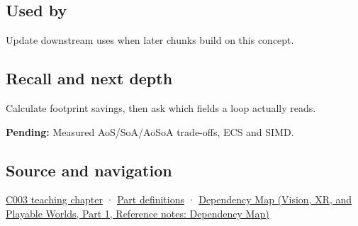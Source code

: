 \subsection{Used by}\label{appendix-5522ad176ca0-used-by}

\hypertarget{appendix-5522ad176ca0-used-by}{}

Update downstream uses when later chunks build on this concept.

\subsection{Recall and next depth}\label{appendix-5522ad176ca0-recall-and-next-depth}

\hypertarget{appendix-5522ad176ca0-recall-and-next-depth}{}

Calculate footprint savings, then ask which fields a loop actually reads.

\textbf{Pending:} Measured AoS/SoA/AoSoA trade-offs, ECS and SIMD.

\subsection{Source and navigation}\label{appendix-5522ad176ca0-source-and-navigation}

\hypertarget{appendix-5522ad176ca0-source-and-navigation}{}

\hyperref[01-foundations-i-ch002-where-the-bytes-live]{C003 teaching chapter} · \hyperref[appendix-fd090d982a15-m003---parts-41-60]{Part definitions} · \href{../07-Vision-XR-and-Playable-Worlds-P01/main.pdf\#appendix-4ad47bdd269a}{Dependency Map (Vision, XR, and Playable Worlds, Part 1, Reference notes: Dependency Map)}
